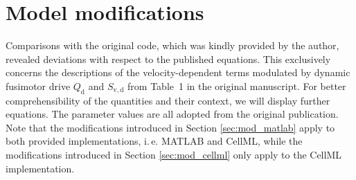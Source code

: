 \documentclass[fleqn,10pt]{physiome}
\begin{document}
\section{Model modifications}\label{sec:modifications}
Comparisons with the original code, which was kindly provided by the author, revealed deviations with respect to the published equations. This exclusively concerns the descriptions of the velocity-dependent terms modulated by dynamic fusimotor drive $Q_{\mathrm d}$ and $S_\mathrm{v,d}$ from Table~1 in the original manuscript. For better comprehensibility of the quantities and their context, we will display further equations. 
The parameter values are all adopted from the original publication.\\
Note that the modifications introduced in Section \ref{sec:mod_matlab} apply to both provided implementations, i.\,e. MATLAB and CellML, while the modifications introduced in Section \ref{sec:mod_cellml} only apply to the CellML implementation. 
%
\end{document}
